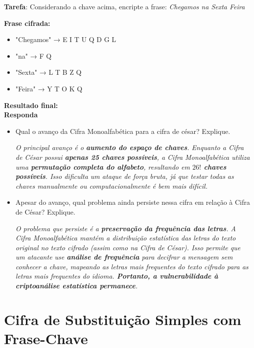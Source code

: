 \textbf{Tarefa}: Considerando a chave acima, encripte a frase:  \textit{Chegamos na Sexta Feira}

\textbf{Frase cifrada:}
\begin{itemize}


    \item     "Chegamos" → E I T U Q D G L

    \item     "na" → F Q

     \item    "Sexta" → L T B Z Q

    \item     "Feira" → Y T O K Q

\end{itemize}

\textbf{Resultado final:}
\\

\textbf{Responda}
\begin{itemize}
    \item Qual o avanço da Cifra Monoalfabética para a cifra de césar? Explique.

    \textit{O principal avanço é o \textbf{aumento do espaço de chaves}. Enquanto a Cifra de César possui \textbf{apenas 25 chaves possíveis}, a Cifra Monoalfabética utiliza uma \textbf{permutação completa do alfabeto}, resultando em \textbf{$26!$  chaves possíveis}. Isso dificulta um ataque de força bruta, já que testar todas as chaves manualmente ou computacionalmente é bem mais difícil.}

    \item Apesar do avanço, qual problema ainda persiste nessa cifra em relação à Cifra de César? Explique.

\textit{    O problema que persiste é a \textbf{preservação da frequência das letras}. A Cifra Monoalfabética mantém a distribuição estatística das letras do texto original no texto cifrado (assim como na Cifra de César). Isso permite que um atacante use \textbf{análise de frequência} para decifrar a mensagem sem conhecer a chave, mapeando as letras mais frequentes do texto cifrado para as letras mais frequentes do idioma. \textbf{Portanto, a vulnerabilidade à criptoanálise estatística permanece}.}
\end{itemize}


\section{Cifra de Substituição Simples com Frase-Chave}

